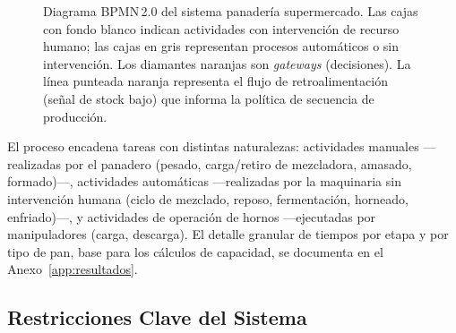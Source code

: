 \documentclass[10pt, a4paper]{article}
\begin{document}
\begin{landscape}
\begin{figure}[H]
{%
}
\caption{Diagrama BPMN\,2.0 del sistema panader\'ia supermercado. Las cajas con
fondo blanco indican actividades con intervenci\'on de recurso humano; las cajas
en gris representan procesos autom\'aticos o sin intervenci\'on. Los diamantes
naranjas son \emph{gateways} (decisiones). La l\'inea punteada naranja
representa el flujo de retroalimentaci\'on (se\~nal de stock bajo) que informa
la pol\'itica de secuencia de producci\'on.}
\label{fig:bpmn}
\end{figure}
\end{landscape}

El proceso encadena tareas con distintas naturalezas: actividades manuales
---realizadas por el panadero (pesado, carga/retiro de mezcladora, amasado,
formado)---, actividades autom\'aticas ---realizadas por la maquinaria sin
intervenci\'on humana (ciclo de mezclado, reposo, fermentaci\'on, horneado,
enfriado)---, y actividades de operaci\'on de hornos ---ejecutadas por
manipuladores (carga, descarga). El detalle granular de tiempos por etapa y
por tipo de pan, base para los c\'alculos de capacidad, se documenta en el
Anexo~\ref{app:resultados}.

\subsection{Restricciones Clave del Sistema}
\end{document}
